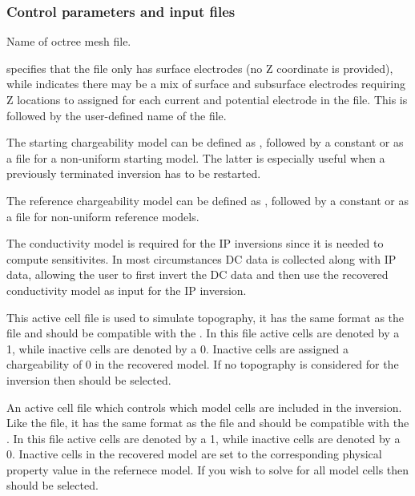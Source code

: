 \subsubsection{Control parameters and input files}
\begin{description}[leftmargin=5cm, style=sameline, align=left]
\item[\fileName{octree mesh}] Name of octree mesh file.
\item[\fileName{LOC\_XY(Z)}]  specifies that the  file only has surface electrodes (no Z coordinate is provided), while  indicates there may be a mix of surface and subsurface electrodes requiring Z locations to assigned for each current and potential electrode in the file. This is followed by the user-defined name of the  file.
\item[\fileName{initial model}] The starting chargeability model can be defined as , followed by a constant or as a  file for a non-uniform starting model. The latter is especially useful when a previously terminated inversion has to be restarted.
\item[\fileName{reference model}] The reference chargeability model can be defined as , followed by a constant or as a  file for non-uniform reference models. 
\item[\fileName{conductivity model}] The conductivity model is required for the IP inversions since it is needed to compute sensitivites. In most circumstances DC data is collected along with IP data, allowing the user to first invert the DC data and then use the recovered conductivity model as input for the IP inversion.
\item[\fileName{topography active cell}] This active cell file is used to simulate topography, it has the same format as the  file and should be compatible with the . In this file active cells are denoted by a 1, while inactive cells are denoted by a 0. Inactive cells are assigned a chargeability of 0 in the recovered model. If no topography is considered for the inversion then  should be selected. 
\item[\fileName{model active cell}] An active cell file which controls which model cells are included in the inversion. Like the  file, it has the same format as the  file and should be compatible with  the .  In this file active cells are denoted by a 1, while inactive cells are denoted by a 0. Inactive cells in the recovered model are set to the corresponding physical property value in the refernece model. If you wish to solve for all model cells then  should be selected.

\end{description}
